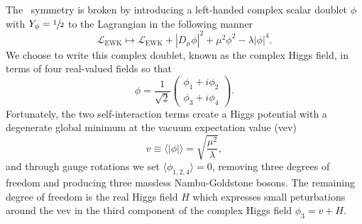 The \sutwo\ symmetry is broken by introducing a left-handed complex scalar doublet $\phi$ with $Y_\phi = \sfrac{1}{2}$ to the Lagrangian in the following manner
\begin{equation}
  \label{eqn:ewsb}
  \mathcal{L}_{\text{EWK}} \mapsto \mathcal{L}_{\text{EWK}} + \left|D_\mu \phi \right|^2 + \mu^2 \phi^2 - \lambda \left| \phi \right|^4 .
\end{equation}
We choose to write this complex doublet, known as the complex Higgs field, in terms of four real-valued fields so that
\begin{equation}
  \phi = \frac{1}{\sqrt{2}} \begin{pmatrix} \phi_1 + i \phi_2 \\ \phi_3 + i\phi_4 \end{pmatrix} .
\end{equation}
Fortunately, the two self-interaction terms create a Higgs potential with a degenerate global minimum at the vacuum expectation value (vev)
\begin{equation}
  v \equiv \langle | \phi | \rangle = \sqrt{ \frac{\mu^2}{\lambda}},
\end{equation}
and through gauge rotations we set $\langle \phi_{1,2,4} \rangle = 0$, removing three degrees of freedom and producing three massless Nambu-Goldstone bosons.
The remaining degree of freedom is the real Higgs field $H$ which expresses small peturbations around the vev in the third component of the complex Higgs field $\phi_3 = v + H$.

